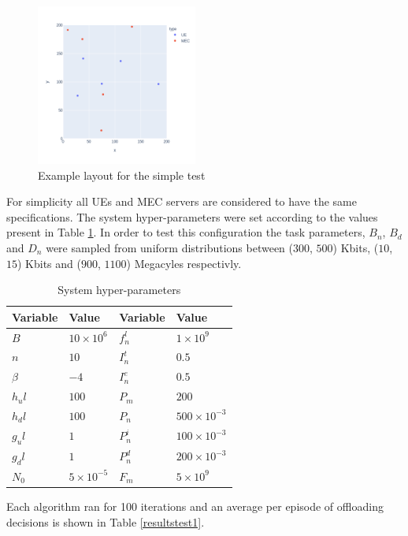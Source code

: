 \begin{figure}[H]
  \centering
  \includegraphics[width=200px]{images/example_layout.png}
  \caption{Example layout for the simple test}  \label{example_layout}
\end{figure}

For simplicity all \acrshort{UE}s and \acrshort{MEC} servers are considered to have the same specifications. The system hyper-parameters were set according to the values present in Table \ref{hyperparams}. In order to test this configuration the task parameters, $B_n$, $B_d$ and $D_n$ were sampled from uniform distributions between ($300$, $500$) Kbits, ($10$, $15$) Kbits and ($900$, $1100$) Megacyles respectivly. 

\begin{table}[H]
\centering
\begin{tabular}{|l|l|l|l|}
\hline
Variable             & Value & Variable                & Value \\ \hline
$B$&$10\times10^{6}$&$f_n^l$&$1\times10^{9}$\\
$n$&$10$&$I_n^t$&$0.5$\\
$\beta$&$-4$&$I_n^e$&$0.5$\\
$h_ul$&$100$& $P_m$&$200$\\
$h_dl$&$100$& $P_n$& $500\times10^{-3}$\\
$g_ul$&$1$&$P_n^i$&$100\times10^{-3}$\\
$g_dl$&$1$&$P_n^d$&$200\times10^{-3}$\\
$N_0$&$5\times10^{-5}$&$F_m$&$5\times10^{9}$\\ \hline
\end{tabular}
\caption{System hyper-parameters}\label{hyperparams}
\end{table}

Each algorithm ran for 100 iterations and an average per episode of offloading decisions is shown in Table \ref{resultstest1}.

